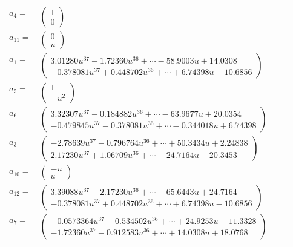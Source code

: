 \documentclass[1p]{elsarticle_modified}
\theoremstyle{definition}
\begin{document}
\begin{tabular}{m{7pt} m{180pt} m{7pt} m{180pt} }
\flushright $a_{4}=$&$\begin{pmatrix}1\\0\end{pmatrix}$ \\
\flushright $a_{11}=$&$\begin{pmatrix}0\\u\end{pmatrix}$ \\
\flushright $a_{1}=$&$\begin{pmatrix}3.01280 u^{37}-1.72360 u^{36}+\cdots-58.9003 u+14.0308\\-0.378081 u^{37}+0.448702 u^{36}+\cdots+6.74398 u-10.6856\end{pmatrix}$ \\
\flushright $a_{5}=$&$\begin{pmatrix}1\\- u^2\end{pmatrix}$ \\
\flushright $a_{6}=$&$\begin{pmatrix}3.32307 u^{37}-0.184882 u^{36}+\cdots-63.9677 u+20.0354\\-0.479845 u^{37}-0.378081 u^{36}+\cdots-0.344018 u+6.74398\end{pmatrix}$ \\
\flushright $a_{3}=$&$\begin{pmatrix}-2.78639 u^{37}-0.796764 u^{36}+\cdots+50.3434 u+2.24838\\2.17230 u^{37}+1.06709 u^{36}+\cdots-24.7164 u-20.3453\end{pmatrix}$ \\
\flushright $a_{10}=$&$\begin{pmatrix}- u\\u\end{pmatrix}$ \\
\flushright $a_{12}=$&$\begin{pmatrix}3.39088 u^{37}-2.17230 u^{36}+\cdots-65.6443 u+24.7164\\-0.378081 u^{37}+0.448702 u^{36}+\cdots+6.74398 u-10.6856\end{pmatrix}$ \\
\flushright $a_{7}=$&$\begin{pmatrix}-0.0573364 u^{37}+0.534502 u^{36}+\cdots+24.9253 u-11.3328\\-1.72360 u^{37}-0.912583 u^{36}+\cdots+14.0308 u+18.0768\end{pmatrix}$ \\

\end{tabular}
\end{document}

